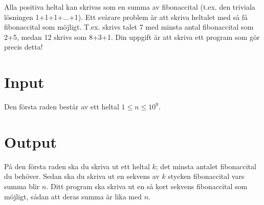 
Alla positiva heltal kan skrivas som en summa av fibonaccital (t.ex. den triviala lösningen 1+1+1+...+1). Ett svårare problem är att skriva heltalet med så få fibonaccital som möjligt. T.ex. skrivs talet 7 med minsta antal fibonaccital som 2+5, medan 12 skrivs som 8+3+1. Din uppgift är att skriva ett program som gör precis detta!

\section*{Input}
Den första raden består av ett heltal $1 \le n \le 10^{9}$.

\section*{Output}
På den första raden ska du skriva ut ett heltal $k$; det minsta antalet fibonaccital du behöver. Sedan ska du skriva ut en sekvens av $k$ stycken fibonaccital vars summa blir $n$.
Ditt program ska skriva ut en så kort sekvens fibonaccital som möjligt, sådan att deras summa är lika med $n$.
